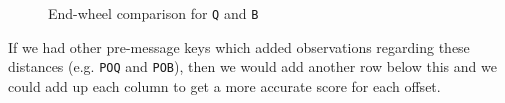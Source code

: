   \begin{figure}[H]
    \begin{center}
    \end{center}
    \caption{End-wheel comparison for \texttt{Q} and \texttt{B}}
  \end{figure}

  \noindent If we had other pre-message keys which added observations
  regarding these distances (e.g. \texttt{POQ} and \texttt{POB}),
  then we would add another row below this and we could add up each
  column to get a more accurate score for each offset.


